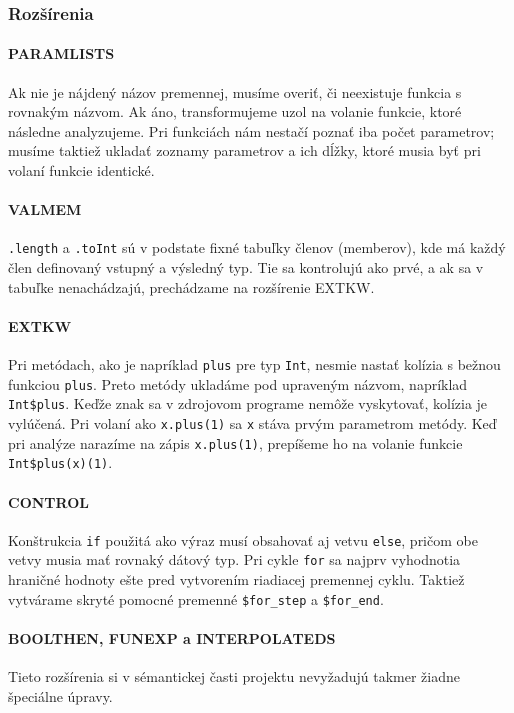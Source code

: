\documentclass{article}
\begin{document}
    \subsubsection{Rozšírenia}
    \paragraph{PARAMLISTS}
        Ak nie je nájdený názov premennej, musíme overiť, či neexistuje funkcia s rovnakým názvom. Ak áno, transformujeme uzol na volanie funkcie, ktoré následne analyzujeme. Pri funkciách nám nestačí poznať iba počet parametrov; musíme taktiež ukladať zoznamy parametrov a ich dĺžky, ktoré musia byť pri volaní funkcie identické.

    \paragraph{VALMEM}
        \texttt{.length} a \texttt{.toInt} sú v podstate fixné tabuľky členov (memberov), kde má každý člen definovaný vstupný a výsledný typ. Tie sa kontrolujú ako prvé, a ak sa v tabuľke nenachádzajú, prechádzame na rozšírenie EXTKW.

    \paragraph{EXTKW}
        Pri metódach, ako je napríklad \texttt{plus} pre typ \texttt{Int}, nesmie nastať kolízia s bežnou funkciou \texttt{plus}. Preto metódy ukladáme pod upraveným názvom, napríklad \texttt{Int\$plus}. Keďže znak \uv{\texttt{\$}} sa v zdrojovom programe nemôže vyskytovať, kolízia je vylúčená. Pri volaní ako \texttt{x.plus(1)} sa \texttt{x} stáva prvým parametrom metódy. Keď pri analýze narazíme na zápis \texttt{x.plus(1)}, prepíšeme ho na volanie funkcie \texttt{Int\$plus(x)(1)}.

    \paragraph{CONTROL}
        Konštrukcia \texttt{if} použitá ako výraz musí obsahovať aj vetvu \texttt{else}, pričom obe vetvy musia mať rovnaký dátový typ. Pri cykle \texttt{for} sa najprv vyhodnotia hraničné hodnoty ešte pred vytvorením riadiacej premennej cyklu. Taktiež vytvárame skryté pomocné premenné \texttt{\$for\_step} a \texttt{\$for\_end}.

    \paragraph{BOOLTHEN, FUNEXP a INTERPOLATEDS}
        Tieto rozšírenia si v sémantickej časti projektu nevyžadujú takmer žiadne špeciálne úpravy.
\end{document}
